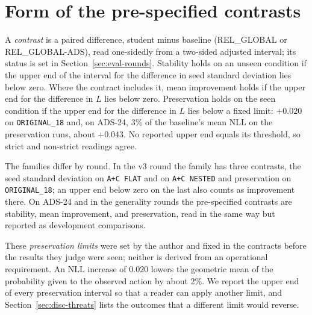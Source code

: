 \section{Form of the pre-specified contrasts}
\label{sec:eval-criteria}

A \emph{contrast} is a paired difference, student minus baseline
(REL\_GLOBAL or REL\_GLOBAL-ADS), read one-sidedly from a two-sided
adjusted interval; its status is set in Section~\ref{sec:eval-rounds}. Stability holds on an unseen condition if the upper end of
the interval for the difference in seed standard deviation lies below
zero. Where the contract includes it, mean improvement holds if the
upper end for the difference in $L$ lies below zero. Preservation holds
on the seen condition if the upper end for the difference in $L$ lies
below a fixed limit: $+0.020$ on \texttt{ORIGINAL\_18} and, on ADS-24,
3\% of the baseline's mean NLL on the preservation runs, about
$+0.043$. No reported upper end equals its threshold, so strict and non-strict
readings agree.

The families differ by round. In the v3 round the family has three
contrasts, the seed standard deviation on \texttt{A+C FLAT} and on
\texttt{A+C NESTED} and preservation on \texttt{ORIGINAL\_18}; an upper
end below zero on the last also counts as improvement there. On ADS-24 and in the generality rounds the pre-specified contrasts are
stability, mean improvement, and preservation, read in the same way but
reported as development comparisons.

These \emph{preservation limits} were set by the author and fixed in
the contracts before the results they judge were seen; neither is
derived from an operational requirement. An NLL increase of $0.020$
lowers the geometric mean of the probability given to the observed
action by about 2\%. We report the upper end of every preservation
interval so that a reader can apply another limit, and
Section~\ref{sec:disc-threats} lists the outcomes that a different
limit would reverse.

